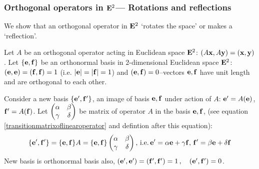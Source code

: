 \documentclass[12pt]{article}
\numberwithin{equation}{section}
\begin{document}
\subsubsection{Orthogonal operators in ${\bf E}^2$---
Rotations and reflections}
\label{rotationindimension2}


We show that an orthogonal operator  in ${\bf E}^2$ `rotates the space' 
or makes a `reflection'.

   Let $A$ be an orthogonal operator acting in Euclidean space  ${\bf E}^2$:
   $(A{\bf x},A{\bf y})=({\bf x},{\bf y})$. Let $\{{\bf e},{\bf f}\}$ be an orthonormal 
basis in $2$-dimensional Euclidean space ${\bf E}^2$:
$({\bf e},{\bf e})=({\bf f},{\bf f})=1$ (i.e. $|{\bf e}|=|{\bf f}|=1$) and $({\bf e},{\bf f})=0$--vectors ${\bf e},{\bf f}$ have unit length and are orthogonal to each other.



Consider a new basis $\{{\bf e}',{\bf f}'\}$, an image of basis ${{\bf e},{\bf f}}$
under action of $A$: ${\bf e}'=A({\bf e})$, ${\bf f}'=A({\bf f})$. Let $ \begin{pmatrix}
      \alpha & \beta \\
      \gamma & \delta\\
       \end{pmatrix}$  be matrix of operator $A$ in the basis ${{\bf e},{\bf f}}$,
(see
 equation \eqref{transitionmatrixoflinearoperator} and defintion 
after this equation):
             $$
    \{{\bf e}',{\bf f}'\}=\{{\bf e},{\bf f}\}A=  \{{\bf e},{\bf f}\}
   \begin{pmatrix}
      \alpha & \beta \\
      \gamma & \delta\\
       \end{pmatrix},
\, {\rm i.e.}\,{\bf e}'=\alpha {\bf e}+\gamma {\bf f},\, {\bf f}'=\beta {\bf e}+\delta {\bf f}
                $$
New basis is orthonormal basis also,
 $({\bf e}',{\bf e}')=({\bf f}',{\bf f}')=1\,,\quad ({\bf e}',{\bf f}')=0$.
\end{document}

